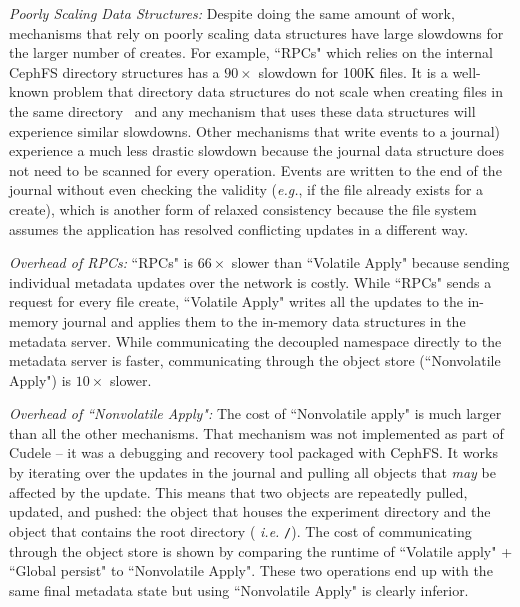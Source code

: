 {\it Poorly Scaling Data Structures:} Despite doing the same amount of work,
mechanisms that rely on poorly scaling data structures have large slowdowns for
the larger number of creates. For example, ``RPCs" which relies on the internal
CephFS directory structures has a \(90\times\) slowdown for 100K files. It is a
well-known problem that directory data structures do not scale when creating
files in the same directory~\cite{ren:sc2014-indexfs} and any mechanism that
uses these data structures will experience similar slowdowns. Other mechanisms
that write events to a journal) experience a much less drastic slowdown because
the journal data structure does not need to be scanned for every operation.
Events are written to the end of the journal without even checking the validity
({\it e.g.}, if the file already exists for a create), which is another form of
relaxed consistency because the file system assumes the application has
resolved conflicting updates in a different way.

{\it Overhead of RPCs:} ``RPCs" is \(66\times\) slower than ``Volatile
Apply" because sending individual metadata updates over the network is costly.
While ``RPCs" sends a request for every file create, ``Volatile Apply"
writes all the updates to the in-memory journal and applies them to the
in-memory data structures in the metadata server. While communicating the
decoupled namespace directly to the metadata server is faster, communicating
through the object store (``Nonvolatile Apply") is \(10\times\) slower.

{\it Overhead of ``Nonvolatile Apply":} The cost of ``Nonvolatile
apply" is much larger than all the other mechanisms.  That mechanism was not
implemented as part of Cudele -- it was a debugging and recovery tool packaged
with CephFS. It works by iterating over the updates in the journal and pulling
all objects that {\it may} be affected by the update.  This means that two
objects are repeatedly pulled, updated, and pushed: the object that houses the
experiment directory and the object that contains the root directory ({\it
i.e.} \texttt{/}).  The cost of communicating through the object store is shown
by comparing the runtime of ``Volatile apply" + ``Global persist" to
``Nonvolatile Apply". These two operations end up with the same final metadata
state but using ``Nonvolatile Apply" is clearly inferior.

